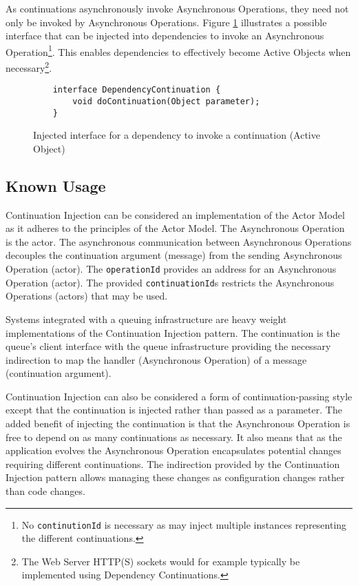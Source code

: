 \documentclass[prodmode]{style/acmlarge}
\begin{document}
As continuations asynchronously invoke Asynchronous Operations, they need not
only be invoked by Asynchronous Operations. Figure \ref{fig:DC_interface}
illustrates a possible interface that can be injected into dependencies to
invoke an Asynchronous Operation\footnote{No \texttt{continutionId} is necessary
as may inject multiple instances representing the different continuations.}. 
This enables dependencies to effectively become Active Objects
\cite{active-object} when necessary\footnote{The Web Server HTTP(S) sockets
would for example typically be implemented using Dependency Continuations.}.

\begin{figure}[tp]
\begin{verbatim}
    interface DependencyContinuation {
        void doContinuation(Object parameter);
    }
\end{verbatim}
\caption{Injected interface for a dependency to invoke a continuation (Active Object)}
\label{fig:DC_interface}
\end{figure}


\subsection{Known Usage}

Continuation Injection can be considered an implementation of the Actor Model
\cite{actors} as it adheres to the principles of the Actor Model.  The
Asynchronous Operation is the actor.  The asynchronous communication between
Asynchronous Operations decouples the continuation argument (message) from the
sending Asynchronous Operation (actor).  The \texttt{operationId} provides an
address for an Asynchronous Operation (actor).  The provided
\texttt{continuationId}s restricts the Asynchronous Operations (actors) that may
be used.

Systems integrated with a queuing infrastructure are heavy weight
implementations of the Continuation Injection pattern.  The continuation is the
queue's client interface with the queue infrastructure providing the necessary
indirection to map the handler (Asynchronous Operation) of a message
(continuation argument).

Continuation Injection can also be considered a form of continuation-passing
style \cite{continuations} except that the continuation is injected rather than
passed as a parameter.  The added benefit of injecting the continuation is that
the Asynchronous Operation is free to depend on as many continuations as
necessary.  It also means that as the application evolves the Asynchronous
Operation encapsulates potential changes requiring different continuations.  The
indirection provided by the Continuation Injection pattern allows managing these
changes as configuration changes rather than code changes.
\end{document}
